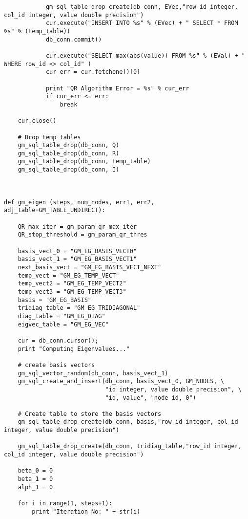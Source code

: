 \documentclass[11pt]{article}
\begin{document}
\begin{lstlisting}
            gm_sql_table_drop_create(db_conn, EVec,"row_id integer, col_id integer, value double precision")
            cur.execute("INSERT INTO %s" % (EVec) + " SELECT * FROM %s" % (temp_table))
            db_conn.commit()
            
            cur.execute("SELECT max(abs(value)) FROM %s" % (EVal) + " WHERE row_id <> col_id" )
            cur_err = cur.fetchone()[0]
            
            print "QR Algorithm Error = %s" % cur_err
            if cur_err <= err:
                break
    
    cur.close()
            
    # Drop temp tables
    gm_sql_table_drop(db_conn, Q)
    gm_sql_table_drop(db_conn, R)
    gm_sql_table_drop(db_conn, temp_table)
    gm_sql_table_drop(db_conn, I)
    
    
    
def gm_eigen (steps, num_nodes, err1, err2, adj_table=GM_TABLE_UNDIRECT):
    
    QR_max_iter = gm_param_qr_max_iter
    QR_stop_threshold = gm_param_qr_thres
    
    basis_vect_0 = "GM_EG_BASIS_VECT0"
    basis_vect_1 = "GM_EG_BASIS_VECT1"
    next_basis_vect = "GM_EG_BASIS_VECT_NEXT"
    temp_vect = "GM_EG_TEMP_VECT"
    temp_vect2 = "GM_EG_TEMP_VECT2"
    temp_vect3 = "GM_EG_TEMP_VECT3"
    basis = "GM_EG_BASIS"
    tridiag_table = "GM_EG_TRIDIAGONAL"
    diag_table = "GM_EG_DIAG"
    eigvec_table = "GM_EG_VEC"
    
    cur = db_conn.cursor();
    print "Computing Eigenvalues..."
    
    # create basis vectors
    gm_sql_vector_random(db_conn, basis_vect_1)    
    gm_sql_create_and_insert(db_conn, basis_vect_0, GM_NODES, \
                             "id integer, value double precision", \
                             "id, value", "node_id, 0")
                             
    # Create table to store the basis vectors    
    gm_sql_table_drop_create(db_conn, basis,"row_id integer, col_id integer, value double precision")
    
    gm_sql_table_drop_create(db_conn, tridiag_table,"row_id integer, col_id integer, value double precision")
    
    beta_0 = 0
    beta_1 = 0
    alph_1 = 0
    
    for i in range(1, steps+1):
        print "Iteration No: " + str(i)


\end{lstlisting}
\end{document}
